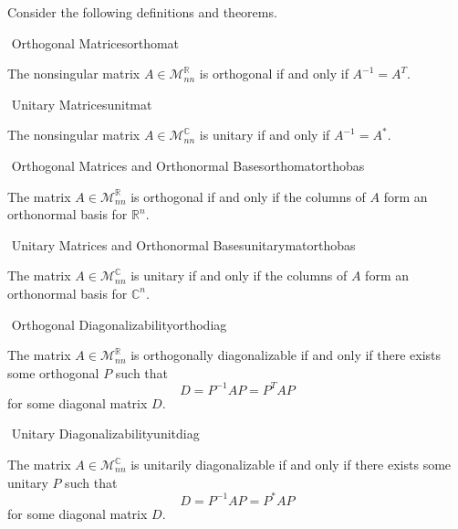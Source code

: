         Consider the following definitions and theorems.
        \begin{definition}{\Stop\,\,Orthogonal Matrices}{orthomat}

            The nonsingular matrix \(A\in\mathcal{M}_{nn}^\mathbb{R}\) is orthogonal if and only if \(A^{-1}=A^T\).
            
        \end{definition}
        \begin{definition}{\Stop\,\,Unitary Matrices}{unitmat}

            The nonsingular matrix \(A\in\mathcal{M}_{nn}^\mathbb{C}\) is unitary if and only if \(A^{-1}=A^*\).
            
        \end{definition}
        \begin{theorem}{\Stop\,\,Orthogonal Matrices and Orthonormal Bases}{orthomatorthobas}

            The matrix \(A\in\mathcal{M}_{nn}^\mathbb{R}\) is orthogonal if and only if the columns of \(A\) form an orthonormal basis for \(\mathbb{R}^n\).
            
        \end{theorem}
        \begin{theorem}{\Stop\,\,Unitary Matrices and Orthonormal Bases}{unitarymatorthobas}

            The matrix \(A\in\mathcal{M}_{nn}^\mathbb{C}\) is unitary if and only if the columns of \(A\) form an orthonormal basis for \(\mathbb{C}^n\).
            
        \end{theorem}
        \begin{definition}{\Stop\,\,Orthogonal Diagonalizability}{orthodiag}

            The matrix \(A\in\mathcal{M}_{nn}^\mathbb{R}\) is orthogonally diagonalizable if and only if there exists some orthogonal \(P\) such that
            \begin{equation*}
                D=P^{-1}AP=P^TAP
            \end{equation*}
            for some diagonal matrix \(D\).
            
        \end{definition}
        \begin{definition}{\Stop\,\,Unitary Diagonalizability}{unitdiag}

            The matrix \(A\in\mathcal{M}_{nn}^\mathbb{C}\) is unitarily diagonalizable if and only if there exists some unitary \(P\) such that
            \begin{equation*}
                D=P^{-1}AP=P^*AP
            \end{equation*}
            for some diagonal matrix \(D\).
            
        \end{definition}
